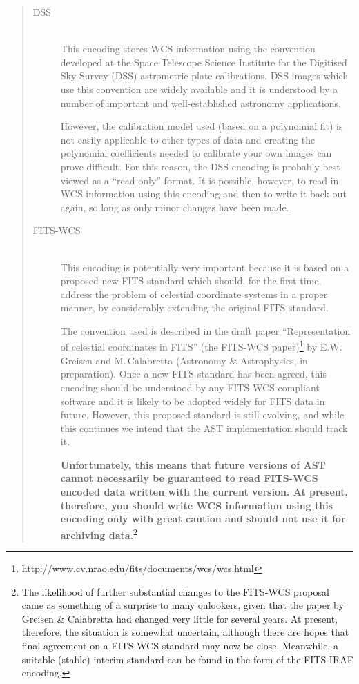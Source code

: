 \documentclass[twoside,11pt]{article}
\newcommand{\htmladdnormallinkfoot}[2]{#1\footnote{#2}}
\newenvironment{latexonly}{}{}
\begin{document}
\begin{quote}
\begin{description}
\item[DSS]\begin{latexonly}\mbox{}\\ \end{latexonly}
This encoding stores WCS information using the convention developed at
the Space Telescope Science Institute for the Digitised Sky Survey
(DSS) astrometric plate calibrations.  DSS images which use this
convention are widely available and it is understood by a number of
important and well-established astronomy applications.

However, the calibration model used (based on a polynomial fit) is not
easily applicable to other types of data and creating the polynomial
coefficients needed to calibrate your own images can prove
difficult. For this reason, the DSS encoding is probably best viewed
as a ``read-only'' format. It is possible, however, to read in WCS
information using this encoding and then to write it back out again,
so long as only minor changes have been made.

\item[FITS-WCS]\begin{latexonly}\mbox{}\\ \end{latexonly}
This encoding is potentially very important because it is based on a
proposed new FITS standard which should, for the first time, address
the problem of celestial coordinate systems in a proper manner, by
considerably extending the original FITS standard.

The convention used is described in the draft paper ``Representation
of celestial coordinates in FITS'' \htmladdnormallinkfoot{(the
FITS-WCS paper)}{http://www.cv.nrao.edu/fits/documents/wcs/wcs.html}
by E.W.\,Greisen and M.\,Calabretta (Astronomy \& Astrophysics, in
preparation). Once a new FITS standard has been agreed, this encoding
should be understood by any FITS-WCS compliant software and it is
likely to be adopted widely for FITS data in future.  However, this
proposed standard is still evolving, and while this continues we
intend that the AST implementation should track it.

{\bf{Unfortunately, this means that future versions of AST cannot
necessarily be guaranteed to read FITS-WCS encoded data written with
the current version.  At present, therefore, you should write WCS
information using this encoding only with great caution and should not
use it for archiving data.}}\footnote{The likelihood of further
substantial changes to the FITS-WCS proposal came as something of a
surprise to many onlookers, given that the paper by Greisen \&
Calabretta had changed very little for several years. At present,
therefore, the situation is somewhat uncertain, although there are
hopes that final agreement on a FITS-WCS standard may now be close.
Meanwhile, a suitable (stable) interim standard can be found in the
form of the FITS-IRAF encoding.}


\end{description}
\end{quote}
\end{document}
